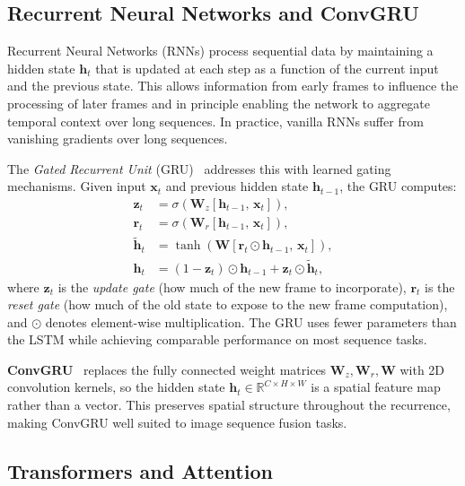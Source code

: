\subsection{Recurrent Neural Networks and ConvGRU}
\label{subsec:rnn}

Recurrent Neural Networks (RNNs) process sequential data by maintaining a hidden state $\mathbf{h}_t$ 
that is updated at each step as a function of the current input and the previous state. 
This allows information from early frames to influence the processing of later frames and in principle 
enabling the network to aggregate temporal context over long sequences. 
In practice, vanilla RNNs suffer from vanishing gradients over long sequences.

The \emph{Gated Recurrent Unit} (GRU)~\cite{cho2014gru} addresses this with learned gating mechanisms. 
Given input $\mathbf{x}_t$ and previous hidden state $\mathbf{h}_{t-1}$, the GRU computes:
\begin{align}
    \mathbf{z}_t &= \sigma\!\left(\mathbf{W}_z [\mathbf{h}_{t-1},\, \mathbf{x}_t]\right), \label{eq:gru_update}\\
    \mathbf{r}_t &= \sigma\!\left(\mathbf{W}_r [\mathbf{h}_{t-1},\, \mathbf{x}_t]\right), \label{eq:gru_reset}\\
    \tilde{\mathbf{h}}_t &= \tanh\!\left(\mathbf{W} [\mathbf{r}_t \odot \mathbf{h}_{t-1},\, \mathbf{x}_t]\right), \label{eq:gru_candidate}\\
    \mathbf{h}_t &= (1 - \mathbf{z}_t) \odot \mathbf{h}_{t-1} + \mathbf{z}_t \odot \tilde{\mathbf{h}}_t, \label{eq:gru_hidden}
\end{align}
where $\mathbf{z}_t$ is the \emph{update gate} (how much of the new frame to incorporate), 
$\mathbf{r}_t$ is the \emph{reset gate} (how much of the old state to expose to the new frame computation), 
and $\odot$ denotes element-wise multiplication. 
The GRU uses fewer parameters than the LSTM while achieving comparable performance on most sequence tasks. \cite{gru_lstm2014} 



\textbf{ConvGRU}~\cite{ballas_2016_delving} replaces the fully connected weight matrices $\mathbf{W}_z, \mathbf{W}_r, \mathbf{W}$ 
with 2D convolution kernels, so the hidden state $\mathbf{h}_t \in \mathbb{R}^{C \times H \times W}$ 
is a spatial feature map rather than a vector. 
This preserves spatial structure throughout the recurrence, making ConvGRU well suited to image sequence 
fusion tasks.


\subsection{Transformers and Attention}
\label{subsec:transformers}

